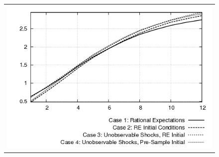 \begin{figure}
\begin{center}
\begin{tabular}{c}
\includegraphics[scale=0.55]{fedfunds_fore.png} \\ 
\end{tabular}
\end{center}
\end{figure}
